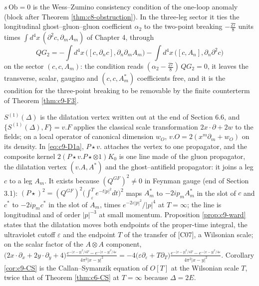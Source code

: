 \begin{remark}
$s\,\mathrm{Ob}=0$ is the Wess--Zumino consistency condition of the one-loop anomaly (block after Theorem \ref{thm:c8-obstruction}). In the three-leg sector it ties the longitudinal ghost--gluon--gluon coefficient $\alpha_2$ to the two-point breaking $-\tfrac{27}8$ units times $\int d^4x\,(\partial^2c,\partial_mA_m)$ of Chapter 4, through
\[
QG_2=-\int d^4x\,\big([c,\partial_nc],\partial_n\partial_mA_m\big)-\int d^4x\,\big([c,A_n],\partial_n\partial^2c\big)
\]
on the sector $(c,c,A_m)$: the condition reads $(\alpha_2-\tfrac{27}8)\,QG_2=0$, it leaves the transverse, scalar, gaugino and $(c,c,A^*_m)$ coefficients free, and it is the condition for the three-point breaking to be removable by the finite counterterm of Theorem \ref{thm:c9-F3}.
\end{remark}

\begin{remark}
$S^{(1)}(\Delta)$ is the dilatation vertex written out at the end of Section 6.6, and $\{S^{(1)}(\Delta),F\}=v.F$ applies the classical scale transformation $2x\cdot\partial+2w$ to the fields; on a local operator of canonical dimension $w_O$, $v.O=2(x^m\partial_m+w_O)$ on its density. In \eqref{eq:c9-D1a}, $P\star v.$ attaches the vertex to one propagator, and the composite kernel $2(P\star v.P\star\otimes1)K_0$ is one line made of the gluon propagator, the dilatation vertex $(v.A,A^*)$ and the ghost--antifield propagator: it joins a leg $c$ to a leg $A_m$. It exists because $(Q^{GF})^2\neq0$ in Feynman gauge (end of Section 3.1): $(P\star)^2=(Q^{GF})^2\big(\int_\varepsilon^Te^{-t|p|^2}dt\big)^2$ maps $A^*_m$ to $-2ip_mA^*_m$ in the slot of $c$ and $c^*$ to $-2ip_mc^*$ in the slot of $A_m$, times $e^{-2\varepsilon|p|^2}/|p|^4$ at $T=\infty$; the line is longitudinal and of order $|p|^{-3}$ at small momentum. Proposition \ref{prop:c9-ward} states that the dilatation moves both endpoints of the proper-time integral, the ultraviolet cutoff $\varepsilon$ and the endpoint $T$ of the transfer of [C07], a Wilsonian scale; on the scalar factor of the $A\otimes A$ component, $\big(2x\cdot\partial_x+2y\cdot\partial_y+4\big)\frac{e^{-|x-y|^2/4T}-e^{-|x-y|^2/4\varepsilon}}{4\pi^2|x-y|^2}=-4\big(\varepsilon\partial_\varepsilon+T\partial_T\big)\frac{e^{-|x-y|^2/4T}-e^{-|x-y|^2/4\varepsilon}}{4\pi^2|x-y|^2}$. Corollary \ref{cor:c9-CS} is the Callan--Symanzik equation of $O[T]$ at the Wilsonian scale $T$, twice that of Theorem \ref{thm:c6-CS} at $T=\infty$ because $\Delta=2E$.
\end{remark}

